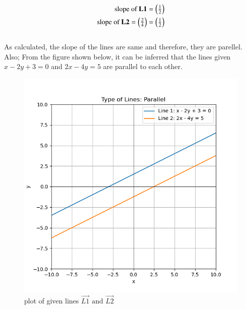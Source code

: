 \documentclass[journal]{IEEEtran}
\begin{document}
\begin{align}
	\text{slope of } \mathbf{L1} = \begin{pmatrix}\frac{1}{2}\end{pmatrix}\\
	\text{slope of } \mathbf{L2} = \begin{pmatrix}\frac{2}{4}\end{pmatrix} = \begin{pmatrix}\frac{1}{2}\end{pmatrix}
\end{align}
\\
As calculated, the slope of the lines are same and therefore, they are parellel.
Also; From the figure shown below, it can be inferred that the lines given $x-2y+3=0$ and $2x-4y=5$ are parallel to each other.
\begin{figure}[ht]
    \centering
    \includegraphics[width=\linewidth]{figs/4-4.4-23.png}
    \caption{plot of given lines $\vec{L1} \text{ and } \vec{L2}$}
    \label{fig:circle_plot}
\end{figure}
  
\end{document}
